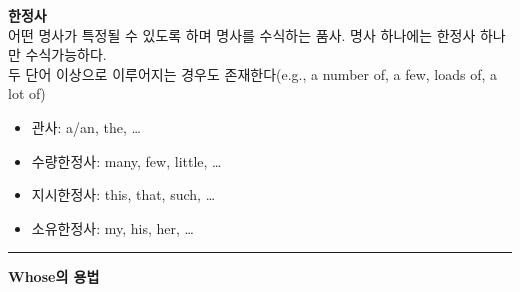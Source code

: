 \documentclass[a4paper]{oblivoir}
\begin{document}
\noindent
    \textbf{\LARGE 한정사}\\

    \noindent 어떤 명사가 특정될 수 있도록 하며 명사를 수식하는 품사. 명사 하나에는 한정사 하나만 수식가능하다.
    \\ 두 단어 이상으로 이루어지는 경우도 존재한다(e.g., a number of, a few, loads of, a lot of)
    \begin{itemize}[label = {--}]
        \item 관사: a/an, the, \ldots
        \item 수량한정사: many, few, little, \ldots
        \item 지시한정사: this, that, such, \ldots
        \item 소유한정사: my, his, her, \ldots
    \end{itemize} 
\rule{\textwidth}{0.4pt}
\vskip 1cm
\noindent
\textbf{\LARGE Whose의 용법}
\end{document}
